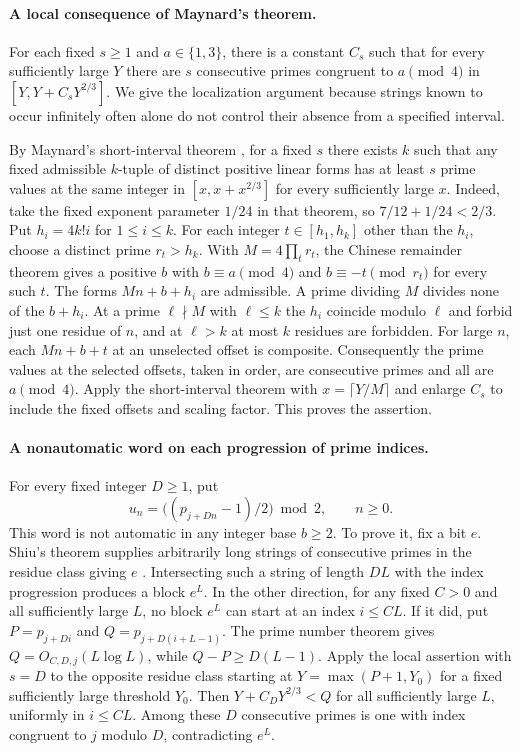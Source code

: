 \documentclass[11pt,a4paper]{article}
\begin{document}
\paragraph{A local consequence of Maynard's theorem.}
For each fixed $s\ge1$ and $a\in\{1,3\}$, there is a constant $C_s$ such that for every sufficiently large $Y$ there are $s$ consecutive primes congruent to $a\pmod4$ in $[Y,Y+C_s Y^{2/3}]$. We give the localization argument because strings known to occur infinitely often \cite{shiu,bftb} alone do not control their absence from a specified interval.

By Maynard's short-interval theorem \cite[Theorem~3.4]{maynard}, for a fixed $s$ there exists $k$ such that any fixed admissible $k$-tuple of distinct positive linear forms has at least $s$ prime values at the same integer in $[x,x+x^{2/3}]$ for every sufficiently large $x$. Indeed, take the fixed exponent parameter $1/24$ in that theorem, so $7/12+1/24<2/3$. Put $h_i=4k!i$ for $1\le i\le k$. For each integer $t\in[h_1,h_k]$ other than the $h_i$, choose a distinct prime $r_t>h_k$. With $M=4\prod_t r_t$, the Chinese remainder theorem gives a positive $b$ with $b\equiv a\pmod4$ and $b\equiv-t\pmod{r_t}$ for every such $t$. The forms $Mn+b+h_i$ are admissible. A prime dividing $M$ divides none of the $b+h_i$. At a prime $\ell\nmid M$ with $\ell\le k$ the $h_i$ coincide modulo $\ell$ and forbid just one residue of $n$, and at $\ell>k$ at most $k$ residues are forbidden. For large $n$, each $Mn+b+t$ at an unselected offset is composite. Consequently the prime values at the selected offsets, taken in order, are consecutive primes and all are $a\pmod4$. Apply the short-interval theorem with $x=\lceil Y/M\rceil$ and enlarge $C_s$ to include the fixed offsets and scaling factor. This proves the assertion.

\paragraph{A nonautomatic word on each progression of prime indices.}
For every fixed integer $D\ge1$, put
\[
 u_n=\big((p_{j+Dn}-1)/2\big)\bmod 2,\qquad n\ge0.
\]
This word is not automatic in any integer base $b\ge2$. To prove it, fix a bit $e$. Shiu's theorem supplies arbitrarily long strings of consecutive primes in the residue class giving $e$ \cite{shiu}. Intersecting such a string of length $DL$ with the index progression produces a block $e^L$. In the other direction, for any fixed $C>0$ and all sufficiently large $L$, no block $e^L$ can start at an index $i\le CL$. If it did, put $P=p_{j+Di}$ and $Q=p_{j+D(i+L-1)}$. The prime number theorem gives $Q=O_{C,D,j}(L\log L)$, while $Q-P\ge D(L-1)$. Apply the local assertion with $s=D$ to the opposite residue class starting at $Y=\max(P+1,Y_0)$ for a fixed sufficiently large threshold $Y_0$. Then $Y+C_DY^{2/3}<Q$ for all sufficiently large $L$, uniformly in $i\le CL$. Among these $D$ consecutive primes is one with index congruent to $j$ modulo $D$, contradicting $e^L$.
\end{document}
